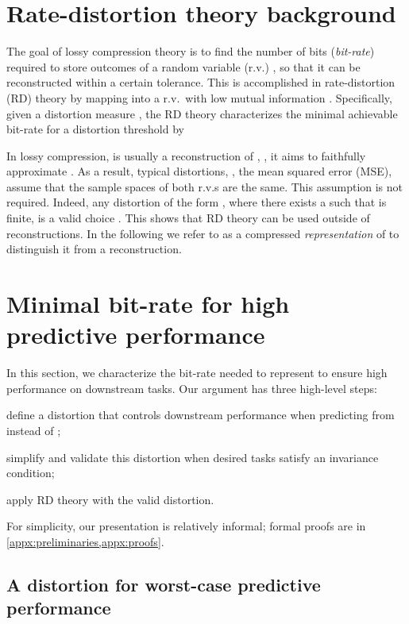 \documentclass[final]{article}
\begin{document}
\section{Rate-distortion theory background}
\label{sec:background}

The goal of lossy compression theory is to find the number of bits (\emph{bit-rate}) required to store outcomes  of a random variable (r.v.) , so that it can be reconstructed within a certain tolerance.
This is accomplished in  rate-distortion (RD) theory by mapping  into a r.v.\  with low mutual information .
Specifically, given a distortion measure , the RD theory characterizes the minimal achievable bit-rate for a distortion threshold  by

In lossy compression,  is usually a reconstruction of , \ie,  it aims to faithfully approximate .
As a result, typical distortions, \eg, the mean squared error (MSE), assume that the sample spaces  of both r.v.s are the same.
This assumption is not required.
Indeed, any distortion  of the form , where there exists a  such that  is finite, is a valid choice \citep{berger_rate_1968}.
This shows that RD theory can be used outside of reconstructions.
In the following we refer to  as a compressed \textit{representation} of  to distinguish it from a reconstruction. 
\section{Minimal bit-rate for high predictive performance}
\label{sec:theory}


In this section, we characterize the bit-rate needed to represent  to ensure high performance on downstream tasks.
Our argument has three high-level steps:
\begin{inlinelist}
    \item define a distortion that controls downstream performance when predicting from  instead of ;
    \item simplify and validate this distortion when desired tasks satisfy an invariance condition;
    \item apply RD theory with the valid distortion.
\end{inlinelist}
For simplicity, our presentation is relatively informal; formal proofs are in \cref{appx:preliminaries,appx:proofs}.



\subsection{A distortion for worst-case predictive performance}
\end{document}
